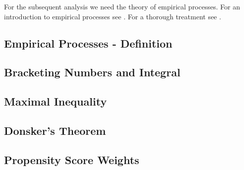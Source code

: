For the subsequent analysis we need the theory of empirical processes.
For an introduction to empirical processes see \cite[§19]{Vaart2000}. For a thorough treatment see \cite[§2]{vaart2013}. 
\subsection{Empirical Processes - Definition}
  
\subsection{Bracketing Numbers and Integral}
  
\subsection{Maximal Inequality}
  
\subsection{Donsker's Theorem}
  
\subsection{Propensity Score Weights}
  
